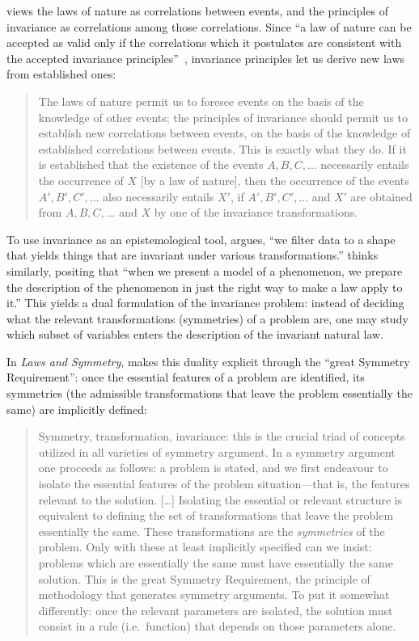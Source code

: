 \citet{wigner1967} views the laws of nature as correlations between events, and the principles of invariance as correlations among those correlations. Since ``a law of nature can be accepted as valid only if the correlations which it postulates are consistent with the accepted invariance principles''~\citep[p.~46]{wigner1967}, invariance principles let us derive new laws from established ones:
\begin{quote}
The laws of nature permit us to foresee events on the basis of the knowledge of other events; the principles of invariance should permit us to establish new correlations between events, on the basis of the knowledge of established correlations between events. This is exactly what they do. If it is established that the existence of the events $A, B, C, \ldots$ necessarily entails the occurrence of $X$ [by a law of nature], then the occurrence of the events $A', B', C', \ldots$ also necessarily entails $X'$, if $A', B', C', \ldots$ and $X'$ are obtained from $A, B, C, \ldots$ and $X$ by one of the invariance transformations. \citep[p. 43]{wigner1967}
\end{quote}

To use invariance as an epistemological tool, \citet[p. 146]{nozick2001} argues, ``we filter data to a shape that yields things that are invariant under various transformations.'' \citet[p. 157]{cartwright1983} thinks similarly, positing that ``when we present a model of a phenomenon, we prepare the description of the phenomenon in just the right way to make a law apply to it.'' This yields a dual formulation of the invariance problem: instead of deciding what the relevant transformations (symmetries) of a problem are, one may study which subset of variables enters the description of the invariant natural law.

In \emph{Laws and Symmetry}, \citet{vanfraassen1989} makes this duality explicit through the ``great Symmetry Requirement'': once the essential features of a problem are identified, its symmetries (the admissible transformations that leave the problem essentially the same) are implicitly defined:
\begin{quote}
Symmetry, transformation, invariance: this is the crucial triad of concepts utilized in all varieties of symmetry argument. In a symmetry argument one proceeds as follows: a problem is stated, and we first endeavour to isolate the essential features of the problem situation---that is, the features relevant to the solution. [\ldots] Isolating the essential or relevant structure is equivalent to defining the set of transformations that leave the problem essentially the same. These transformations are the \emph{symmetries} of the problem. Only with these at least implicitly specified can we insist: problems which are essentially the same must have essentially the same solution. This is the great Symmetry Requirement, the principle of methodology that generates symmetry arguments. To put it somewhat differently: once the relevant parameters are isolated, the solution must consist in a rule (i.e.\ function) that depends on those parameters alone. \citep[pp. 258--259]{vanfraassen1989}
\end{quote}

